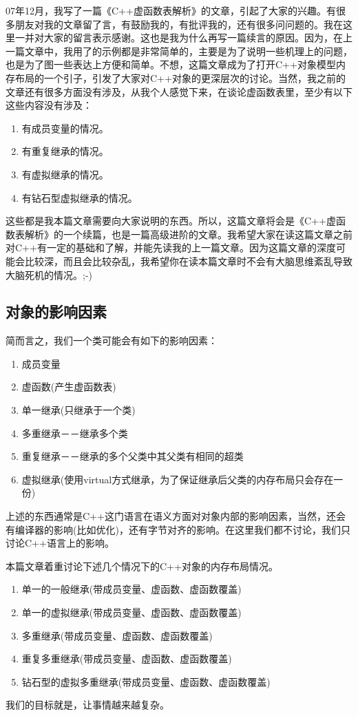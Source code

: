 \documentclass{article}
\begin{document}
\begin{CJK}{UTF8}{gbsn}
07年12月，我写了一篇《C++虚函数表解析》的文章，引起了大家的兴趣。有很多朋友对我的文章留了言，有鼓励我的，有批评我的，还有很多问问题的。我在这里一并对大家的留言表示感谢。这也是我为什么再写一篇续言的原因。因为，在上一篇文章中，我用了的示例都是非常简单的，主要是为了说明一些机理上的问题，也是为了图一些表达上方便和简单。不想，这篇文章成为了打开C++对象模型内存布局的一个引子，引发了大家对C++对象的更深层次的讨论。当然，我之前的文章还有很多方面没有涉及，从我个人感觉下来，在谈论虚函数表里，至少有以下这些内容没有涉及：
\begin{enumerate}
\item 有成员变量的情况。
\item 有重复继承的情况。
\item 有虚拟继承的情况。
\item 有钻石型虚拟继承的情况。
\end{enumerate}
这些都是我本篇文章需要向大家说明的东西。所以，这篇文章将会是《C++虚函数表解析》的一个续篇，也是一篇高级进阶的文章。我希望大家在读这篇文章之前对C++有一定的基础和了解，并能先读我的上一篇文章。因为这篇文章的深度可能会比较深，而且会比较杂乱，我希望你在读本篇文章时不会有大脑思维紊乱导致大脑死机的情况。;-)

\subsection{对象的影响因素}

简而言之，我们一个类可能会有如下的影响因素：

\begin{enumerate}
\item 成员变量
\item 虚函数(产生虚函数表)
\item 单一继承(只继承于一个类)
\item 多重继承－－继承多个类
\item 重复继承－－继承的多个父类中其父类有相同的超类
\item 虚拟继承(使用virtual方式继承，为了保证继承后父类的内存布局只会存在一份)
\end{enumerate} 

上述的东西通常是C++这门语言在语义方面对对象内部的影响因素，当然，还会有编译器的影响(比如优化)，还有字节对齐的影响。在这里我们都不讨论，我们只讨论C++语言上的影响。
 
本篇文章着重讨论下述几个情况下的C++对象的内存布局情况。

\begin{enumerate}
\item 单一的一般继承(带成员变量、虚函数、虚函数覆盖)
\item 单一的虚拟继承(带成员变量、虚函数、虚函数覆盖)
\item 多重继承(带成员变量、虚函数、虚函数覆盖)
\item 重复多重继承(带成员变量、虚函数、虚函数覆盖)
\item 钻石型的虚拟多重继承(带成员变量、虚函数、虚函数覆盖)
\end{enumerate} 
我们的目标就是，让事情越来越复杂。


\end{CJK}
\end{document}
